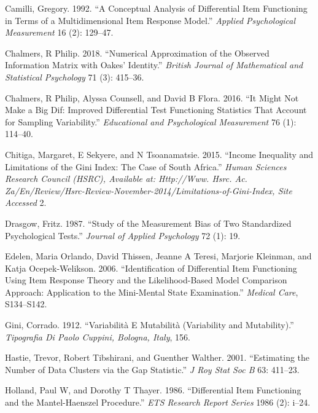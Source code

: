 \documentclass[
  11pt,
]{article}
\begin{document}
\leavevmode\hypertarget{ref-camilli1992conceptual}{}%
Camilli, Gregory. 1992. ``A Conceptual Analysis of Differential Item Functioning in Terms of a Multidimensional Item Response Model.'' \emph{Applied Psychological Measurement} 16 (2): 129--47.

\leavevmode\hypertarget{ref-chalmers2018numerical}{}%
Chalmers, R Philip. 2018. ``Numerical Approximation of the Observed Information Matrix with Oakes' Identity.'' \emph{British Journal of Mathematical and Statistical Psychology} 71 (3): 415--36.

\leavevmode\hypertarget{ref-chalmers2016might}{}%
Chalmers, R Philip, Alyssa Counsell, and David B Flora. 2016. ``It Might Not Make a Big Dif: Improved Differential Test Functioning Statistics That Account for Sampling Variability.'' \emph{Educational and Psychological Measurement} 76 (1): 114--40.

\leavevmode\hypertarget{ref-chitiga2015income}{}%
Chitiga, Margaret, E Sekyere, and N Tsoanamatsie. 2015. ``Income Inequality and Limitations of the Gini Index: The Case of South Africa.'' \emph{Human Sciences Research Council (HSRC), Available at: Http://Www. Hsrc. Ac. Za/En/Review/Hsrc-Review-November-2014/Limitations-of-Gini-Index, Site Accessed} 2.

\leavevmode\hypertarget{ref-drasgow1987study}{}%
Drasgow, Fritz. 1987. ``Study of the Measurement Bias of Two Standardized Psychological Tests.'' \emph{Journal of Applied Psychology} 72 (1): 19.

\leavevmode\hypertarget{ref-edelen2006identification}{}%
Edelen, Maria Orlando, David Thissen, Jeanne A Teresi, Marjorie Kleinman, and Katja Ocepek-Welikson. 2006. ``Identification of Differential Item Functioning Using Item Response Theory and the Likelihood-Based Model Comparison Approach: Application to the Mini-Mental State Examination.'' \emph{Medical Care}, S134--S142.

\leavevmode\hypertarget{ref-gini1912variabilita}{}%
Gini, Corrado. 1912. ``Variabilità E Mutabilità (Variability and Mutability).'' \emph{Tipografia Di Paolo Cuppini, Bologna, Italy}, 156.

\leavevmode\hypertarget{ref-hastie2001estimating}{}%
Hastie, Trevor, Robert Tibshirani, and Guenther Walther. 2001. ``Estimating the Number of Data Clusters via the Gap Statistic.'' \emph{J Roy Stat Soc B} 63: 411--23.

\leavevmode\hypertarget{ref-holland1986differential}{}%
Holland, Paul W, and Dorothy T Thayer. 1986. ``Differential Item Functioning and the Mantel-Haenszel Procedure.'' \emph{ETS Research Report Series} 1986 (2): i--24.
\end{document}

